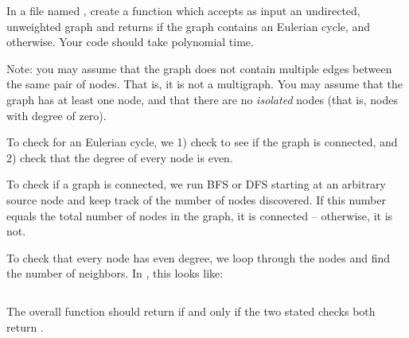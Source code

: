 \begin{progprob}
    In a file named , create a function 
    which accepts as input an undirected, unweighted graph and returns  if
    the graph contains an Eulerian cycle, and  otherwise. Your code should
    take polynomial time.

    Note: you may assume that the graph does not contain multiple edges between the same
    pair of nodes. That is, it is not a multigraph. You may assume that the graph has
    at least one node, and that there are no \emph{isolated} nodes (that is, nodes with
    degree of zero).

    \begin{soln}
        To check for an Eulerian cycle, we 1) check to see if the graph is connected,
        and 2) check that the degree of every node is even.

        To check if a graph is connected, we run BFS or DFS starting at an arbitrary
        source node and keep track of the number of nodes discovered. If this number
        equals the total number of nodes in the graph, it is connected -- otherwise,
        it is not.

        To check that every node has even degree, we loop through the nodes and find
        the number of neighbors. In , this looks like:
        \inputminted{python}{\thisdir/include-solution/all_even.py}

        The overall function should return  if and only if the two stated
        checks both return .
    \end{soln}
\end{progprob}
